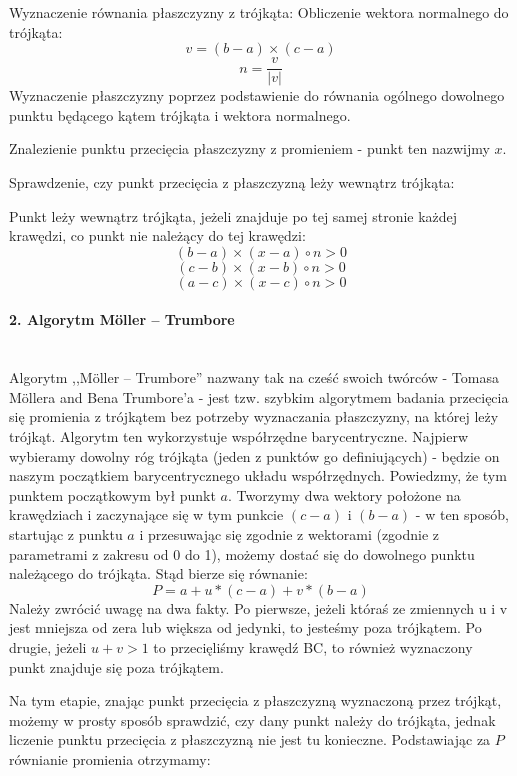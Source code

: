 \begin{outline}[enumerate]

\1 Wyznaczenie równania płaszczyzny z trójkąta:
\2 Obliczenie wektora normalnego do trójkąta:
	$$v = (b - a) \times (c - a)$$
	$$n = \frac{v}{|v|}$$ 
\2 Wyznaczenie płaszczyzny poprzez podstawienie do równania ogólnego  dowolnego punktu będącego kątem trójkąta i wektora normalnego.

\1 Znalezienie punktu przecięcia płaszczyzny z promieniem - punkt ten nazwijmy $x$.

\1 Sprawdzenie, czy punkt przecięcia z płaszczyzną leży wewnątrz trójkąta:

\2 Punkt leży wewnątrz trójkąta, jeżeli znajduje po tej samej stronie każdej krawędzi, co punkt nie należący do tej krawędzi:
$$(b - a) \times (x - a) \circ n > 0$$
$$(c - b) \times (x - b) \circ n > 0$$
$$(a - c) \times (x - c) \circ n > 0$$

\end{outline}
\paragraph{2. Algorytm Möller – Trumbore}\mbox{} \\

Algorytm ,,Möller – Trumbore'' nazwany tak na cześć swoich twórców - Tomasa Möllera and Bena Trumbore'a - jest tzw. szybkim algorytmem badania przecięcia się promienia z trójkątem bez potrzeby wyznaczania płaszczyzny, na której leży trójkąt. Algorytm ten wykorzystuje współrzędne barycentryczne. Najpierw wybieramy dowolny róg trójkąta (jeden z punktów go definiujących) - będzie on naszym początkiem barycentrycznego układu współrzędnych. Powiedzmy, że tym punktem początkowym był punkt $a$. Tworzymy dwa wektory położone na krawędziach i zaczynające się w tym punkcie $(c - a)$ i $(b - a)$ - w ten sposób, startując z punktu $a$ i przesuwając się zgodnie z wektorami (zgodnie z parametrami z zakresu od 0 do 1), możemy dostać się do dowolnego punktu należącego do trójkąta. Stąd bierze się równanie:
$$P = a + u * (c - a) + v * (b - a)$$
Należy zwrócić uwagę na dwa fakty. Po pierwsze, jeżeli któraś ze zmiennych u i v jest mniejsza od zera lub większa od jedynki, to jesteśmy poza trójkątem. Po drugie, jeżeli $u + v > 1$ to przecięliśmy krawędź BC, to również wyznaczony punkt znajduje się poza trójkątem.


Na tym etapie, znając punkt przecięcia z płaszczyzną wyznaczoną przez trójkąt, możemy w prosty sposób sprawdzić, czy dany punkt należy do trójkąta, jednak liczenie punktu przecięcia z płaszczyzną nie jest tu konieczne. Podstawiając za $P$ równianie promienia otrzymamy:

